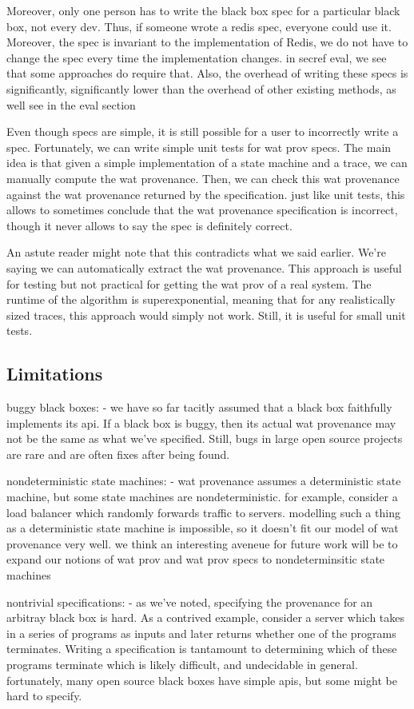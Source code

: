 Moreover, only one person has to write the black box spec for a particular black box, not every dev. Thus, if someone wrote a redis spec, everyone could use it. Moreover, the spec is invariant to the implementation of Redis, we do not have to change the spec every time the implementation changes. in secref eval, we see that some approaches do require that. Also, the overhead of writing these specs is significantly, significantly lower than the overhead of other existing methods, as well see in the eval section

Even though specs are simple, it is still possible for a user to incorrectly write a spec. Fortunately, we can write simple unit tests for wat prov specs. The main idea is that given a simple implementation of a state machine and a trace, we can manually compute the wat provenance. Then, we can check this wat provenance against the wat provenance returned by the specification. just like unit tests, this allows to sometimes conclude that the wat provenance specification is incorrect, though it never allows to say the spec is definitely correct.

An astute reader might note that this contradicts what we said earlier. We're saying we can automatically extract the wat provenance. This approach is useful for testing but not practical for getting the wat prov of a real system. The runtime of the algorithm is superexponential, meaning that for any realistically sized traces, this approach would simply not work. Still, it is useful for small unit tests.

\subsection{Limitations}
buggy black boxes:
  - we have so far tacitly assumed that a black box faithfully implements its api. If a black box is buggy, then its actual wat provenance may not be the same as what we've specified. Still, bugs in large open source projects are rare and are often fixes after being found.

nondeterministic state machines:
  - wat provenance assumes a deterministic state machine, but some state machines are nondeterministic. for example, consider a load balancer which randomly forwards traffic to servers. modelling such a thing as a deterministic state machine is impossible, so it doesn't fit our model of wat provenance very well. we think an interesting aveneue for future work will be to expand our notions of wat prov and wat prov specs to nondeterminsitic state machines

nontrivial specifications:
  - as we've noted, specifying the provenance for an arbitray black box is hard. As a contrived example, consider a server which takes in a series of programs as inputs and later returns whether one of the programs terminates. Writing a specification is tantamount to determining which of these programs terminate which is likely difficult, and undecidable in general. fortunately, many open source black boxes have simple apis, but some might be hard to specify.
